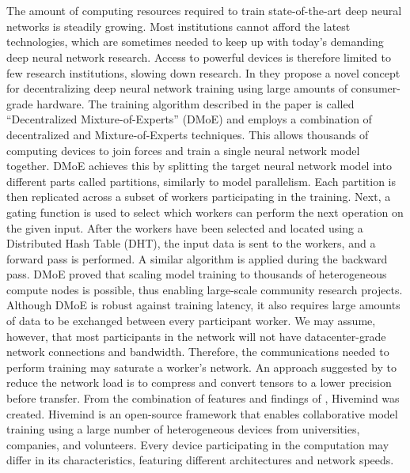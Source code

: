\chapter{\abstractname}

The amount of computing resources required to train state-of-the-art deep neural networks is steadily growing.
Most institutions cannot afford the latest technologies, which are sometimes needed to keep up with today's demanding deep neural network research.
Access to powerful devices is therefore limited to few research institutions, slowing down research.
In \cite{ryabinin2020learning} they propose a novel concept for decentralizing deep neural network training using large amounts of consumer-grade hardware.
The training algorithm described in the paper is called ``Decentralized Mixture-of-Experts'' (DMoE) and employs a combination of decentralized and Mixture-of-Experts \cite{shazeer2017outrageously} techniques. This allows thousands of computing devices to join forces and train a single
neural network model together.
DMoE achieves this by splitting the target neural network model into
different parts called partitions, similarly to model parallelism.
Each partition is then replicated across a subset of workers participating in the training.
Next, a gating function is used to select which workers can perform the next operation on the given input.
After the workers have been selected and located using a Distributed Hash Table (DHT), the input data is sent to the workers, and a forward pass is performed.
A similar algorithm is applied during the backward pass.
DMoE proved that scaling model training to thousands of heterogeneous compute nodes is possible, thus enabling large-scale community research projects.
Although DMoE is robust against training latency, it also requires large amounts of data to be exchanged between every participant worker.
We may assume, however, that most participants in the network will not have datacenter-grade network connections and bandwidth.
Therefore, the communications needed to perform training may saturate a worker's network.
An approach suggested by \cite{ryabinin2020learning} to reduce the network load is to compress and convert tensors to a lower precision before transfer.
From the combination of features and findings of \cite{ryabinin2020learning,ryabinin2021mosphit}, Hivemind was created.
Hivemind \cite{hivemind} is an open-source framework that enables collaborative model training using a large number of heterogeneous devices from universities, companies, and volunteers.
Every device participating in the computation may differ in its characteristics, featuring different architectures and network speeds.
